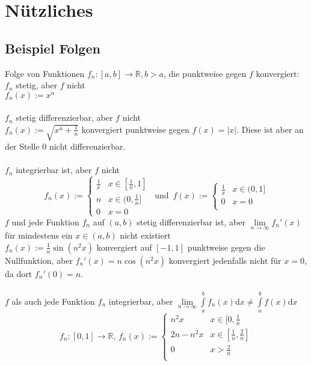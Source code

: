 \documentclass[10pt,a4paper^, twocolumn]{article}
\renewcommand{\d}{\mathrm{d}} %
\newcommand{\R}{\mathbb{R}}
\begin{document}
\section{Nützliches}
\subsection{Beispiel Folgen}
Folge von Funktionen $f_n: [a,b] \rightarrow \R, b > a$, die punktweise gegen $f$ konvergiert:
$f_n$ stetig, aber $f$ nicht\\
$f_n(x) := x^n$ \\\\
$f_n$ stetig differenzierbar, aber $f$ nicht\\
$f_n(x) := \sqrt{x^n + \frac{1}{n}}$ konvergiert punktweise gegen $f(x) = |x|$. Diese ist aber an der Stelle $0$ nicht differenzierbar. \\\\
$f_n$ integrierbar ist, aber $f$ nicht\\
$$ f_n(x) := \begin{cases} \frac{1}{x} & x \in [\frac{1}{n},1] \\
n & x \in (0, \frac{1}{n}] \\
0 & x = 0 \end{cases}
\, \text{ und } \, f(x) := \begin{cases} \frac{1}{x} & x \in (0,1] \\
0 & x = 0 \\ \end{cases}$$
$f$ und jede Funktion $f_n$ auf $(a,b)$ stetig differenzierbar ist, aber $\lim \limits_{n \to \infty} f_n'(x)$ für mindestens ein $x \in (a,b)$ nicht existiert\\
$f_n(x) := \frac{1}{n} \sin(n^2 x)$ konvergiert auf $[-1,1]$ punktweise gegen die Nullfunktion, aber $f_n'(x) = n \cos(n^2 x)$ konvergiert jedenfalls nicht für $x = 0$, da dort $f_n'(0) = n$.\\\\
$f$ als auch jede Funktion $f_n$ integrierbar, aber $\lim \limits_{n \to \infty} \int \limits_a^b f_n(x) \d x \neq \int \limits_a^b f(x) \d x$
$$ f_n : [0,1] \rightarrow \R, \, f_n(x) := \begin{cases} n^2 x & x \in [0,\frac{1}{n} \\
2n-n^2 x & x \in [\frac{1}{n},\frac{2}{n}] \\
0 & x > \frac{2}{n} \\ \end{cases}$$
\end{document}

